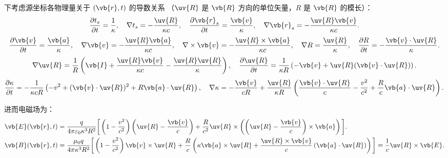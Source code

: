 下考虑源坐标各物理量关于 \((\vb{r}, t)\) 的导数关系 （\(\uv{R}\) 是 \(\vb{R}\) 方向的单位矢量，\(R\) 是 \(\vb{R}\) 的模长）：
\begin{align*}
	\dfrac{\partial t_s}{\partial t} = \dfrac{1}{\kappa},\quad \nabla t_s = -\dfrac{\uv{R}}{\kappa c},\quad
	\dfrac{\partial \vb{r}_s}{\partial t} = \dfrac{\vb{v}}{\kappa},\quad \nabla \vb{r}_s = -\dfrac{\uv{R} \vb{v}}{\kappa c}.
\end{align*}
\begin{align*}
	\dfrac{\partial \vb{v}}{\partial t} = \dfrac{\vb{a}}{\kappa}, \quad \nabla \vb{v} = -\dfrac{\uv{R} \vb{a}}{\kappa c}, \quad \nabla \times \vb{v} = -\dfrac{\uv{R} \times \vb{a}}{\kappa c},\quad
	\nabla R = \dfrac{\uv{R}}{\kappa}, \quad \dfrac{\partial R}{\partial t} = -\dfrac{\vb{v} \cdot \uv{R}}{\kappa}.
\end{align*}
\begin{align*}
	\nabla \uv{R} = \dfrac{1}{R} \left( \vb{I} + \dfrac{\uv{R} \vb{v}}{\kappa c} - \dfrac{\uv{R} \uv{R}}{\kappa} \right), \quad \dfrac{\partial \uv{R}}{\partial t} = \dfrac{1}{\kappa R} \left( -\vb{v} + \uv{R} (\vb{v} \cdot \uv{R}) \right).
\end{align*}
\begin{align*}
	\dfrac{\partial \kappa}{\partial t} = -\dfrac{1}{\kappa c R} \left( -v^2 + (\vb{v} \cdot \uv{R})^2 + R \vb{a} \cdot \uv{R} \right), \quad \nabla \kappa = -\dfrac{\vb{v}}{c R} + \dfrac{\uv{R}}{\kappa R} \left( \dfrac{\vb{v} \cdot \uv{R}}{c} - \dfrac{v^2}{c^2} + \dfrac{R}{c} \vb{a} \cdot \uv{R} \right).
\end{align*}

进而电磁场为：
\begin{align*}
	\vb{E}(\vb{r}, t)
	&= \dfrac{q}{4\pi \varepsilon_0 \kappa^3 R^2} \bigg[ \left(1 - \dfrac{v^2}{c^2}\right) \left( \uv{R} - \dfrac{\vb{v}}{c} \right) + \dfrac{R}{c^2} \uv{R} \times \left( \left( \uv{R} - \dfrac{\vb{v}}{c} \right) \times \vb{a} \right) \bigg].\\
	\vb{B}(\vb{r}, t)
	&= \dfrac{\mu_0 q}{4\pi \kappa^3 R^2} \bigg[ \left(1 - \dfrac{v^2}{c^2}\right) \vb{v} \times \uv{R} + \dfrac{R}{c} \left( \kappa \vb{a} \times \uv{R} + \dfrac{\uv{R} \times \vb{v}}{c} \left( \vb{a} \cdot \uv{R} \right) \right) \bigg] = \dfrac{1}{c} \uv{R} \times \vb{E}.
\end{align*}

